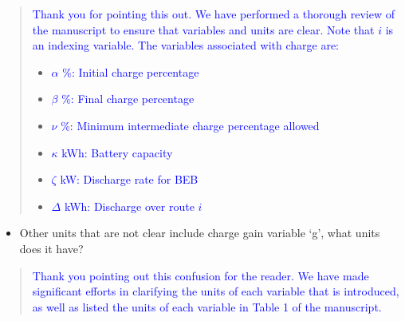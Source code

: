 \documentclass[11pt,a4paper,final]{article}
\begin{document}
\begin{quote}
\textcolor{blue}{Thank you for pointing this out. We have performed a thorough review of the manuscript to ensure that variables and units are clear. Note that $i$ is an indexing variable. The variables associated with charge are:}

\begin{itemize}
\item \textcolor{blue}{$\alpha$ \%: Initial charge percentage}
\item \textcolor{blue}{$\beta$ \%: Final charge percentage}
\item \textcolor{blue}{$\nu$ \%: Minimum intermediate charge percentage allowed}
\item \textcolor{blue}{$\kappa$ kWh: Battery capacity}
\item \textcolor{blue}{$\zeta$ kW: Discharge rate for BEB}
\item \textcolor{blue}{$\Delta$ kWh: Discharge over route $i$}
\end{itemize}
\end{quote}

\begin{itemize}
\item Other units that are not clear include charge gain variable ‘g’, what units does it have?
\end{itemize}

\begin{quote}
\textcolor{blue}{Thank you pointing out this confusion for the reader. We have made significant efforts in clarifying the units of each variable that is introduced, as well as listed the units of each variable in Table 1 of the manuscript.}
\end{quote}
\end{document}
